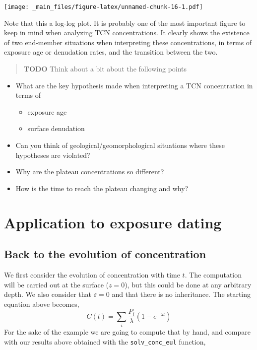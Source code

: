 \documentclass[
]{book}
\providecommand{\tightlist}{%
  \setlength{\itemsep}{0pt}\setlength{\parskip}{0pt}}
\begin{document}
\texttt{[image: \_main\_files/figure-latex/unnamed-chunk-16-1.pdf]}

Note that this a log-log plot. It is probably one of the most important figure to keep in mind when analyzing TCN concentrations. It clearly shows the existence of two end-member situations when interpreting these concentrations, in terms of exposure age or denudation rates, and the transition between the two.

\begin{quote}
\textbf{TODO} Think about a bit about the following points
\end{quote}

\begin{itemize}
\tightlist
\item
  What are the key hypothesis made when interpreting a TCN concentration in terms of

  \begin{itemize}
  \tightlist
  \item
    exposure age
  \item
    surface denudation
  \end{itemize}
\item
  Can you think of geological/geomorphological situations where these hypotheses are violated?
\item
  Why are the plateau concentrations so different?
\item
  How is the time to reach the plateau changing and why?
\end{itemize}

\hypertarget{application-to-exposure-dating}{%
\chapter{Application to exposure dating}\label{application-to-exposure-dating}}

\hypertarget{back-to-the-evolution-of-concentration}{%
\section{Back to the evolution of concentration}\label{back-to-the-evolution-of-concentration}}

We first consider the evolution of concentration with time \(t\).
The computation will be carried out at the surface (\(z=0\)), but this could be done at any arbitrary depth.
We also consider that \(\varepsilon = 0\) and that there is no inheritance.
The starting equation above becomes, \[
C(t)=\sum_i \frac{P_i}{\lambda}(1-e^{-\lambda t})
\]
For the sake of the example we are going to compute that by hand, and compare with our results above obtained with the \texttt{solv\_conc\_eul} function,
\end{document}
